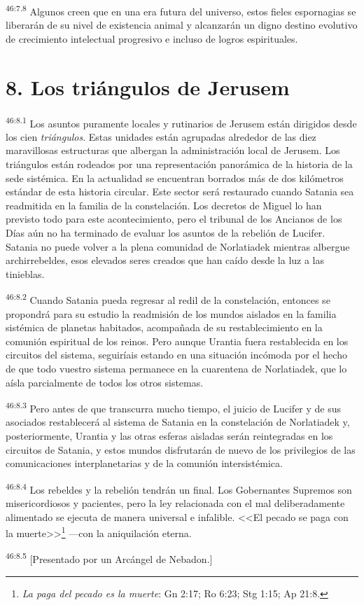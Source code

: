 \par
\textsuperscript{46:7.8} Algunos creen que en una era futura del universo, estos fieles espornagias se liberarán de su nivel de existencia animal y alcanzarán un digno destino evolutivo de crecimiento intelectual progresivo e incluso de logros espirituales.

\section*{8. Los triángulos de Jerusem}
\par
\textsuperscript{46:8.1} Los asuntos puramente locales y rutinarios de Jerusem están dirigidos desde los cien \textit{triángulos}. Estas unidades están agrupadas alrededor de las diez maravillosas estructuras que albergan la administración local de Jerusem. Los triángulos están rodeados por una representación panorámica de la historia de la sede sistémica. En la actualidad se encuentran borrados más de dos kilómetros estándar de esta historia circular. Este sector será restaurado cuando Satania sea readmitida en la familia de la constelación. Los decretos de Miguel lo han previsto todo para este acontecimiento, pero el tribunal de los Ancianos de los Días aún no ha terminado de evaluar los asuntos de la rebelión de Lucifer. Satania no puede volver a la plena comunidad de Norlatiadek mientras albergue archirrebeldes, esos elevados seres creados que han caído desde la luz a las tinieblas.

\par
\textsuperscript{46:8.2} Cuando Satania pueda regresar al redil de la constelación, entonces se propondrá para su estudio la readmisión de los mundos aislados en la familia sistémica de planetas habitados, acompañada de su restablecimiento en la comunión espiritual de los reinos. Pero aunque Urantia fuera restablecida en los circuitos del sistema, seguiríais estando en una situación incómoda por el hecho de que todo vuestro sistema permanece en la cuarentena de Norlatiadek, que lo aísla parcialmente de todos los otros sistemas.

\par
\textsuperscript{46:8.3} Pero antes de que transcurra mucho tiempo, el juicio de Lucifer y de sus asociados restablecerá al sistema de Satania en la constelación de Norlatiadek y, posteriormente, Urantia y las otras esferas aisladas serán reintegradas en los circuitos de Satania, y estos mundos disfrutarán de nuevo de los privilegios de las comunicaciones interplanetarias y de la comunión intersistémica.

\par
\textsuperscript{46:8.4} Los rebeldes y la rebelión tendrán un final. Los Gobernantes Supremos son misericordiosos y pacientes, pero la ley relacionada con el mal deliberadamente alimentado se ejecuta de manera universal e infalible. <<El pecado se paga con la muerte>>\footnote{\textit{La paga del pecado es la muerte}: Gn 2:17; Ro 6:23; Stg 1:15; Ap 21:8.} ---con la aniquilación eterna.

\par
\textsuperscript{46:8.5} [Presentado por un Arcángel de Nebadon.]